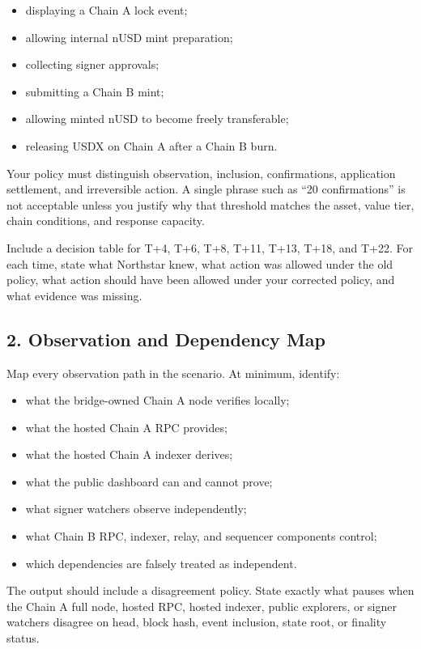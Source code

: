 \begin{itemize}
\item displaying a Chain A lock event;
\item allowing internal nUSD mint preparation;
\item collecting signer approvals;
\item submitting a Chain B mint;
\item allowing minted nUSD to become freely transferable;
\item releasing USDX on Chain A after a Chain B burn.
\end{itemize}

Your policy must distinguish observation, inclusion, confirmations, application settlement, and irreversible action. A single phrase such as ``20 confirmations'' is not acceptable unless you justify why that threshold matches the asset, value tier, chain conditions, and response capacity.

Include a decision table for T+4, T+6, T+8, T+11, T+13, T+18, and T+22. For each time, state what Northstar knew, what action was allowed under the old policy, what action should have been allowed under your corrected policy, and what evidence was missing.

\subsection*{2. Observation and Dependency Map}

Map every observation path in the scenario. At minimum, identify:

\begin{itemize}
\item what the bridge-owned Chain A node verifies locally;
\item what the hosted Chain A RPC provides;
\item what the hosted Chain A indexer derives;
\item what the public dashboard can and cannot prove;
\item what signer watchers observe independently;
\item what Chain B RPC, indexer, relay, and sequencer components control;
\item which dependencies are falsely treated as independent.
\end{itemize}

The output should include a disagreement policy. State exactly what pauses when the Chain A full node, hosted RPC, hosted indexer, public explorers, or signer watchers disagree on head, block hash, event inclusion, state root, or finality status.

